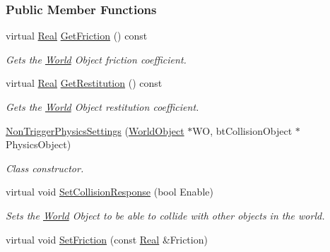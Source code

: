 \subsubsection*{Public Member Functions}
\begin{DoxyCompactItemize}
\item 
virtual \hyperlink{namespaceMezzanine_a726731b1a7df72bf3583e4a97282c6f6}{Real} \hyperlink{classMezzanine_1_1NonTriggerPhysicsSettings_a8a26cd19ebf73d58b52c794665c66c79}{GetFriction} () const 
\begin{DoxyCompactList}\small\item\em Gets the \hyperlink{classMezzanine_1_1World}{World} Object friction coefficient. \item\end{DoxyCompactList}\item 
virtual \hyperlink{namespaceMezzanine_a726731b1a7df72bf3583e4a97282c6f6}{Real} \hyperlink{classMezzanine_1_1NonTriggerPhysicsSettings_afcd2fa0a18a77f08d95f5824f94a8d1b}{GetRestitution} () const 
\begin{DoxyCompactList}\small\item\em Gets the \hyperlink{classMezzanine_1_1World}{World} Object restitution coefficient. \item\end{DoxyCompactList}\item 
\hyperlink{classMezzanine_1_1NonTriggerPhysicsSettings_aaeda1ca7117e33be5c285e59f4d78cba}{NonTriggerPhysicsSettings} (\hyperlink{classMezzanine_1_1WorldObject}{WorldObject} $\ast$WO, btCollisionObject $\ast$PhysicsObject)
\begin{DoxyCompactList}\small\item\em Class constructor. \item\end{DoxyCompactList}\item 
virtual void \hyperlink{classMezzanine_1_1NonTriggerPhysicsSettings_a4812a17ef87c192ee6204e216334c878}{SetCollisionResponse} (bool Enable)
\begin{DoxyCompactList}\small\item\em Sets the \hyperlink{classMezzanine_1_1World}{World} Object to be able to collide with other objects in the world. \item\end{DoxyCompactList}\item 
virtual void \hyperlink{classMezzanine_1_1NonTriggerPhysicsSettings_a75f0c352df35028b7b51c8c14bcba8ce}{SetFriction} (const \hyperlink{namespaceMezzanine_a726731b1a7df72bf3583e4a97282c6f6}{Real} \&Friction)

\end{DoxyCompactItemize}
